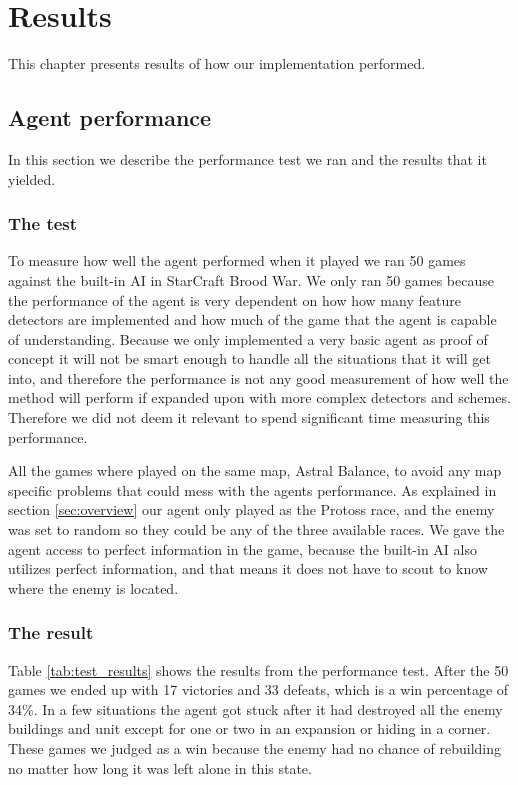 
\chapter{Results}
This chapter presents results of how our implementation performed.

\section{Agent performance}
In this section we describe the performance test we ran and the results that it yielded.
\subsection{The test}
To measure how well the agent performed when it played we ran 50 games against the built-in AI in StarCraft Brood War. We only ran 50 games because the performance of the agent is very dependent on how how many feature detectors are implemented and how much of the game that the agent is capable of understanding. Because we only implemented a very basic agent as proof of concept it will not be smart enough to handle all the situations that it will get into, and therefore the performance is not any good measurement of how well the method will perform if expanded upon with more complex detectors and schemes. Therefore we did not deem it relevant to spend significant time measuring this performance.

All the games where played on the same map, Astral Balance, to avoid any map specific problems that could mess with the agents performance. As explained in section \ref{sec:overview} our agent only played as the Protoss race, and the enemy was set to random so they could be any of the three available races. We gave the agent access to perfect information in the game, because the built-in AI also utilizes perfect information, and that means it does not have to scout to know where the enemy is located.

\subsection{The result}
Table \ref{tab:test_results} shows the results from the performance test. After the 50 games we ended up with 17 victories and 33 defeats, which is a win percentage of 34\%. In a few situations the agent got stuck after it had destroyed all the enemy buildings and unit except for one or two in an expansion or hiding in a corner. These games we judged as a win because the enemy had no chance of rebuilding no matter how long it was left alone in this state.

